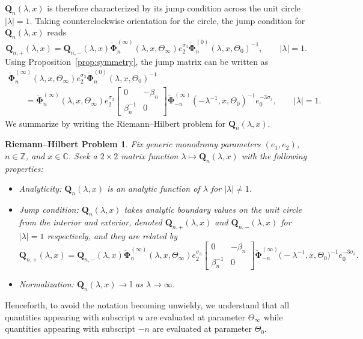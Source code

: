 \documentclass[pdftex]{sigma}
\numberwithin{equation}{section}
\newtheorem{rhp}[Theorem]{Riemann--Hilbert Problem}
\newcommand{\para}[1]{\breve{#1}}
\begin{document}
$\mathbf{Q}_n(\lambda,x)$ is therefore characterized by its jump condition across the unit circle $|\lambda|=1$. Taking counterclockwise orientation for the circle, the jump condition for $\mathbf{Q}_n(\lambda,x)$ reads
\begin{equation*}
 \mathbf{Q}_{n,+}(\lambda,x)=\mathbf{Q}_{n,-}(\lambda,x)\para{\mathbf{\Phi}}_n^{(\infty)}(\lambda,x, \Theta_\infty)e_2^{\sigma_3}\para{\mathbf{\Phi}}_n^{(0)}(\lambda,x, \Theta_0)^{-1},\qquad |\lambda|=1.
\end{equation*}
Using Proposition~\ref{prop:symmetry}, the jump matrix can be written as
\begin{gather}
 \para{\mathbf{\Phi}}_n^{(\infty)}(\lambda,x, \Theta_\infty)e_2^{\sigma_3}\para{\mathbf{\Phi}}_n^{(0)}(\lambda,x, \Theta_0)^{-1}\nonumber\\
 \qquad =\para{\mathbf{\Phi}}^{(\infty)}_n(\lambda,x, \Theta_\infty) e_2^{\sigma_3}
 \begin{bmatrix}0 & -\beta_n\\ \beta_n^{-1} & 0\end{bmatrix}
 \para{\mathbf{\Phi}}^{(\infty)}_{-n}(-\lambda^{-1},x, \Theta_0)^{-1}e_0^{-3\sigma_3},\qquad |\lambda|=1.\label{eq:VQ-rewrite}
\end{gather}
We summarize by writing the Riemann--Hilbert problem for $\mathbf{Q}_n(\lambda,x)$.
\begin{rhp}\label{rhp:Q}
Fix generic monodromy parameters $( e_1, e_2)$, $n\in\mathbb{Z}$, and $x\in\mathbb{C}$. Seek a $2\times 2$ matrix function $\lambda\mapsto\mathbf{Q}_n(\lambda,x)$ with the following properties:
\begin{itemize}\itemsep=0pt\samepage
 \item Analyticity: $\mathbf{Q}_n(\lambda,x)$ is an analytic function of $\lambda$ for $|\lambda|\neq 1$.
 \item Jump condition:
 $\mathbf{Q}_n(\lambda,x)$ takes analytic boundary values on the unit circle from the interior and exterior, denoted $\mathbf{Q}_{n,+}(\lambda,x)$ and $\mathbf{Q}_{n,-}(\lambda,x)$ for $|\lambda|=1$ respectively, and they are related by
 \begin{equation*}
 \mathbf{Q}_{n,+}(\lambda,x)=\mathbf{Q}_{n,-}(\lambda,x)\breve{\mathbf{\Phi}}_n^{(\infty)}(\lambda,x,\Theta_\infty)e_2^{\sigma_3}
 \begin{bmatrix}0 & -\beta_n\\\beta_n^{-1} & 0\end{bmatrix}
 \para{\mathbf{\Phi}}^{(\infty)}_{-n}\bigl(-\lambda^{-1},x, \Theta_0\bigr)^{-1}e_0^{-3\sigma_3}.
 \end{equation*}
 \item Normalization:
 $\mathbf{Q}_n(\lambda,x)\to\mathbb{I}$ as $\lambda\to\infty$.
\end{itemize}
\end{rhp}
Henceforth, to avoid the notation becoming unwieldy, we understand that all quantities appearing with subscript $n$ are evaluated at parameter $\Theta_\infty$ while quantities appearing with subscript $-n$ are evaluated at parameter $\Theta_0$.
\end{document}

